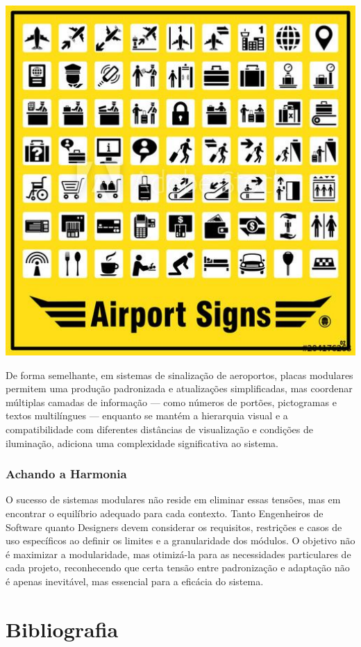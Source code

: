 \documentclass[12pt]{article}
\begin{document}
\vspace{5px}

\noindent
\begin{minipage}{0.4\textwidth}
\includegraphics[width=1\textwidth]{airport-signs.jpg}
\end{minipage}
\begin{minipage}{0.6\textwidth}\raggedright
De forma semelhante, em sistemas de sinalização de aeroportos, placas modulares permitem uma produção padronizada e atualizações simplificadas, mas coordenar múltiplas camadas de informação — como números de portões, pictogramas e textos multilíngues — enquanto se mantém a hierarquia visual e a compatibilidade com diferentes distâncias de visualização e condições de iluminação, adiciona uma complexidade significativa ao sistema.
\end{minipage}

\subsubsection{Achando a Harmonia}
O sucesso de sistemas modulares não reside em eliminar essas tensões, mas em encontrar o equilíbrio adequado para cada contexto. Tanto Engenheiros de Software quanto Designers devem considerar os requisitos, restrições e casos de uso específicos ao definir os limites e a granularidade dos módulos. O objetivo não é maximizar a modularidade, mas otimizá-la para as necessidades particulares de cada projeto, reconhecendo que certa tensão entre padronização e adaptação não é apenas inevitável, mas essencial para a eficácia do sistema.

\section{Bibliografia}
\renewcommand{\bibfont}{\raggedright}
\renewcommand{\bibname}{}
\renewcommand{\refname}{}
\printbibliography
\end{document}
